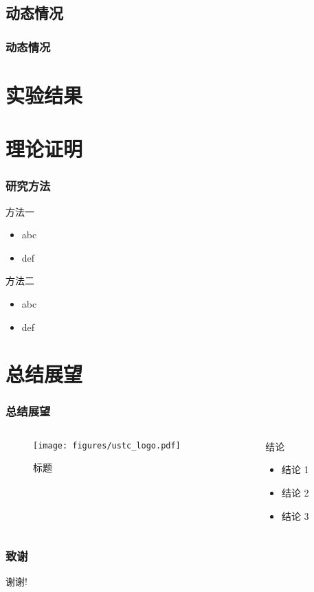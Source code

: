 \documentclass[aspectratio=169]{ctexbeamer}
\begin{document}
\subsection{动态情况}
\begin{frame}
  \frametitle{动态情况}
 
\end{frame}


\section{实验结果}

\section{理论证明}

\begin{frame}
  \frametitle{研究方法}
  \begin{block}{方法一}
    \begin{itemize}
      \item abc
      \item def
    \end{itemize}
  \end{block}
  \pause
  \begin{block}{方法二}
    \begin{itemize}
      \item abc
      \item def
    \end{itemize}
  \end{block}
\end{frame}


\section{总结展望}

\begin{frame}
  \frametitle{总结展望}
  \begin{columns}
    \begin{column}{0.50\textwidth}
      \begin{figure}
        \texttt{[image: figures/ustc\_logo.pdf]}
        \caption{标题}
      \end{figure}
    \end{column}
    \begin{column}{0.50\textwidth}
      \begin{block}{结论}
        \begin{itemize}
          \item 结论 1
          \item 结论 2
          \item 结论 3
        \end{itemize}
      \end{block}
    \end{column}
  \end{columns}
\end{frame}

\begin{frame}
  \frametitle{致谢}
  \centerline{\Large 谢谢!}
\end{frame}
\end{document}
